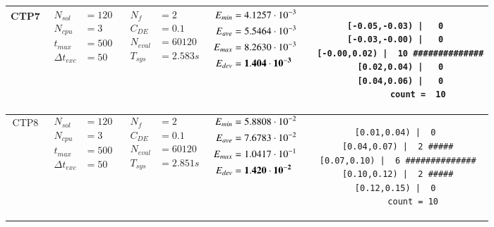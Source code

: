 \begin{table*} [!t]
\begin{tabular}[c]{ccccc}
\hline



CTP7
&
{$\!\begin{aligned}
    N_{sol}        &= 120 \\
	N_{cpu}        &= 3 \\
	t_{max}        &= 500 \\
	\Delta t_{exc} &= 50
\end{aligned}$}
&
{$\!\begin{aligned}
	N_{f}    &= 2 \\
	C_{DE}   &= 0.1 \\
	N_{eval} &= 60120 \\
	T_{sys}  &= 2.583s
\end{aligned}$}
&
{$\!\begin{aligned}
    E_{min} &= 4.1257\cdot 10^{-3} \\
    E_{ave} &= 5.5464\cdot 10^{-3} \\
    E_{max} &= 8.2630\cdot 10^{-3} \\
    E_{dev} &= {\bf 1.404\cdot 10^{-3}}
\end{aligned}$}
&
\begin{minipage}{4.1cm} \fontsize{5pt}{6pt}
\begin{verbatim}
 [-0.05,-0.03) |   0 
 [-0.03,-0.00) |   0 
  [-0.00,0.02) |  10 ##############
   [0.02,0.04) |   0 
   [0.04,0.06) |   0 
         count =  10
 \end{verbatim}
\end{minipage} \\

\hline



CTP8
&
{$\!\begin{aligned}
    N_{sol}        &= 120 \\
	N_{cpu}        &= 3 \\
	t_{max}        &= 500 \\
	\Delta t_{exc} &= 50
\end{aligned}$}
&
{$\!\begin{aligned}
	N_{f}    &= 2 \\
	C_{DE}   &= 0.1 \\
	N_{eval} &= 60120 \\
	T_{sys}  &= 2.851s
\end{aligned}$}
&
{$\!\begin{aligned}
    E_{min} &= 5.8808\cdot 10^{-2} \\
    E_{ave} &= 7.6783\cdot 10^{-2} \\
    E_{max} &= 1.0417\cdot 10^{-1} \\
    E_{dev} &= {\bf 1.420\cdot 10^{-2}}
\end{aligned}$}
&
\begin{minipage}{4.1cm} \fontsize{5pt}{6pt}
\begin{verbatim}
 [0.01,0.04) |  0 
 [0.04,0.07) |  2 #####
 [0.07,0.10) |  6 ##############
 [0.10,0.12) |  2 #####
 [0.12,0.15) |  0 
       count = 10
 \end{verbatim}
\end{minipage} \\


\end{tabular}
\end{table*}
